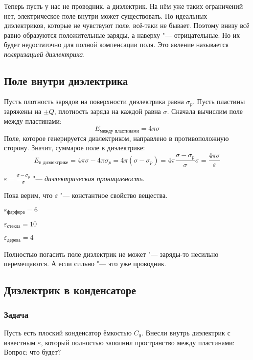 		Теперь пусть у нас не проводник, а диэлектрик.
		На нём уже таких ограничений нет, электрическое поле внутри может существовать.
		Но идеальных диэлектриков, которые не чувствуют поле, всё-таки не бывает.
		Поэтому внизу всё равно образуются положительные заряды, а наверху "--- отрицательные.
		Но их будет недостаточно для полной компенсации поля.
		Это явление называется \textit{поляризацией диэлектрика}.

	\subsection{Поле внутри диэлектрика}
		Пусть плотность зарядов на поверхности диэлектрика равна $\sigma_p$.
		Пусть пластины заряжены на $\pm Q$, плотность заряда на каждой равна $\sigma$.
		Сначала вычислим поле между пластинами:
		\[E_{\text{между пластинами}} = 4\pi \sigma\]
		Поле, которое генерируется диэлектриком, направлено в противоположную сторону.
		Значит, суммарое поле в диэлектрике:
		\[ E_\text{в диэлектрике}
			= 4\pi\sigma - 4\pi\sigma_p
			= 4\pi(\sigma - \sigma_p)
			= 4\pi\frac{\sigma - \sigma_p}{\sigma}\sigma
			= \frac{4\pi\sigma}{\varepsilon}
		\]
		\begin{Def}
			$\varepsilon = \frac{\sigma - \sigma_p}{\sigma}$ "--- \textit{диэлектрическая проницаемость}.
		\end{Def}
		\begin{Rem}
			Пока верим, что $\varepsilon$ "--- константное свойство вещества.
		\end{Rem}
		\begin{exmp}$\varepsilon_\text{фарфора} = 6$\end{exmp}
		\begin{exmp}$\varepsilon_\text{стекла} = 10$\end{exmp}
		\begin{exmp}$\varepsilon_\text{дерева} = 4$\end{exmp}
		\begin{Rem}
			Полностью погасить поле диэлектрик не может "--- заряды-то несильно перемещаются.
			А если сильно "--- это уже проводник.
		\end{Rem}

	\subsection{Диэлектрик в конденсаторе}
		\subsubsection{Задача}
			Пусть есть плоский конденсатор ёмкостью $C_0$.
			Внесли внутрь диэлектрик с известным $\varepsilon$, который полностью заполнил пространство между пластинами:
			Вопрос: что будет?

